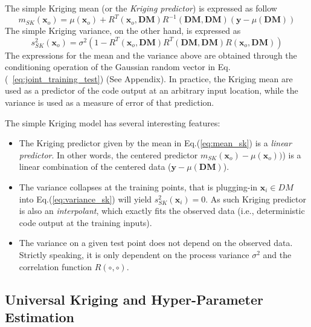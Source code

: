 The simple Kriging mean (or the \emph{Kriging predictor}) is expressed as follow
\begin{equation}
	m_{SK} (\mathbf{x}_o) = \mu (\mathbf{x}_o) + R^T(\mathbf{x}_o, \mathbf{DM}) R^{-1}(\mathbf{DM}, \mathbf{DM}) (\mathbf{y} - \mu(\mathbf{DM}))
\label{eq:mean_sk}
\end{equation}
The simple Kriging variance, on the other hand, is expressed as
\begin{equation}
	s^2_{SK} (\mathbf{x}_o) = \sigma^2 (1 - R^T(\mathbf{x}_o, \mathbf{DM}) R^T(\mathbf{DM}, \mathbf{DM}) R(\mathbf{x}_o, \mathbf{DM}))
\label{eq:variance_sk}
\end{equation}
The expressions for the mean and the variance above are obtained through the conditioning operation of the Gaussian random vector in Eq.(~\ref{eq:joint_training_test}) (See Appendix). 
In practice, the Kriging mean are used as a predictor of the code output at an arbitrary input location, 
while the variance is used as a measure of error of that prediction.

The simple Kriging model has several interesting features:
\begin{itemize}
	\item The Kriging predictor given by the mean in Eq.(\ref{eq:mean_sk}) is a \emph{linear predictor}. 
	      In other words, the centered predictor $m_{SK}(\mathbf{x}_o) - \mu (\mathbf{x}_o))$)  is a linear combination of the centered data 
	      ($\mathbf{y} - \mu(\mathbf{DM})$).
	\item The variance collapses at the training points, that is plugging-in $\mathbf{x}_i \in DM$ into Eq.(\ref{eq:variance_sk}) will yield $s^2_{SK}(\mathbf{x}_i) = 0$.
	      As such Kriging predictor is also an \emph{interpolant}, which exactly fits the observed data (i.e., deterministic code output at the training inputs).
	\item The variance on a given test point does not depend on the observed data. 
	      Strictly speaking, it is only dependent on the process variance $\sigma^2$ and the correlation function $R(\circ,\circ)$.
\end{itemize}



\subsection{Universal Kriging and Hyper-Parameter Estimation}\label{sub:gp_uk}

